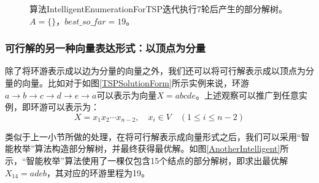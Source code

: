 \begin{figure}
   \caption{\fangsong 算法{\sc IntelligentEnumerationForTSP}迭代执行7轮后产生的部分解树。$A=\{\}$，$best\_so\_far=19$。}
   \label{Step7}
\end{figure}


 \subsubsection{可行解的另一种向量表达形式：以顶点为分量}
  除了将环游表示成以边为分量的向量之外，我们还可以将可行解表示成以顶点为分量的向量。比如对于如图\ref{TSPSolutionForm}所示实例来说，环游$a\rightarrow b \rightarrow c \rightarrow d \rightarrow e  \rightarrow a$可以表示为向量$X=abcde$。上述观察可以推广到任意实例，即环游可以表示为：
  \[
  	X=x_{1}x_{2}\cdots x_{n-2},\quad x_{i} \in V\quad (1\leq i \leq n-2)
  \]
  
   类似于上一小节所做的处理，在将可行解表示成向量形式之后，我们可以采用“智能枚举”算法构造部分解树，并最终获得最优解。如图\ref{AnotherIntelligent}所示，“智能枚举”算法使用了一棵仅包含15个结点的部分解树，即求出最优解$X_{14}=adeb$，其对应的环游里程为19。
   
